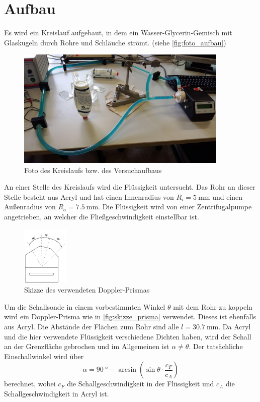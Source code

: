 \section{Aufbau}
\label{sec:Aufbau}

Es wird ein Kreislauf aufgebaut, in dem ein Wasser-Glycerin-Gemisch mit Glaskugeln durch Rohre und Schläuche strömt. (siehe \autoref{fig:foto_aufbau})

\begin{figure}
    \centering
    \includegraphics[width=0.9\textwidth]{images/foto_1.jpg}
    \caption{Foto des Kreislaufs bzw. des Versuchaufbaus}
    \label{fig:foto_aufbau}
\end{figure}

An einer Stelle des Kreislaufs wird die Flüssigkeit untersucht.
Das Rohr an dieser Stelle besteht aus Acryl und hat einen Innenradius von $R_i=\SI{5}{\milli\metre}$ und einen Außenradius von $R_a=\SI{7.5}{\milli\metre}$.
Die Flüssigkeit wird von einer Zentrifugalpumpe angetrieben, an welcher die Fließgeschwindigkeit einstellbar ist.

\begin{figure}
    \centering
    \includegraphics[width=0.2\textwidth]{images/skizze_2.png}
    \caption{Skizze des verwendeten Doppler-Prismas \cite{US3}}
    \label{fig:skizze_prisma}
\end{figure}

Um die Schallsonde in einem vorbestimmten Winkel $\theta$ mit dem Rohr zu koppeln wird ein Doppler-Prisma wie in \autoref{fig:skizze_prisma} verwendet.
Dieses ist ebenfalls aus Acryl.
Die Abstände der Flächen zum Rohr sind alle $l=\SI{30.7}{\milli\metre}$.
Da Acryl und die hier verwendete Flüssigkeit verschiedene Dichten haben, wird der Schall an der Grenzfläche gebrochen und im Allgemeinen ist $\alpha \neq \theta$.
Der tatsächliche Einschallwinkel wird über
\begin{equation}
    \alpha = \SI{90}{\degree} - \arcsin \left( \sin \theta \cdot \frac{c_F}{c_A} \right)
    \label{eq:dopplerwinkel}
\end{equation}
berechnet, wobei $c_F$ die Schallgeschwindigkeit in der Flüssigkeit und $c_A$ die Schallgeschwindigkeit in Acryl ist.



